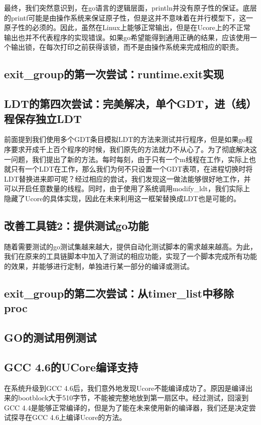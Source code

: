 \documentclass{article}
\begin{document}
最终，我们突然意识到，在go语言的逻辑层面，println并没有原子性的保证。底层的printf可能是由操作系统来保证原子性，但是这并不意味着在并行模型下，这一原子性的必须的。因此，虽然在Linux上能够正常输出，但是在Ucore上的不正常输出也并不代表程序的实现错误。如果go希望能得到通用正确的结果，应该使用一个输出锁，在每次打印之前获得该锁，而不是由操作系统来完成相应的职责。

\subsection{exit\_group的第一次尝试：runtime.exit实现}

\subsection{LDT的第四次尝试：完美解决，单个GDT，进（线）程保存独立LDT}
前面提到我们使用多个GDT条目模拟LDT的方法来测试并行程序，但是如果go程序要求开成千上百个程序的时候，我们原先的方法就力不从心了。为了彻底解决这一问题，我们提出了新的方法。每时每刻，由于只有一个m线程在工作，实际上也就只有一个LDT在工作，那么我们为何不只设置一个GDT表项，在进程切换时将LDT替换进来即可呢？经过相应的尝试，我们发现这一做法能够很好地工作，并可以开启任意数量的线程。同时，由于使用了系统调用modify\_ldt，我们实际上隐藏了Ucore的具体实现，因此在未来利用这一框架替换成LDT也是可能的。

\subsection{改善工具链2：提供测试go功能}
随着需要测试的go测试集越来越大，提供自动化测试脚本的需求越来越高。为此，我们在原来的工具链脚本中加入了测试的相应功能，实现了一个脚本完成所有功能的效果，并能够进行定制，单独进行某一部分的编译或测试。

\subsection{exit\_group的第二次尝试：从timer\_list中移除proc}

\subsection{GO的测试用例测试}

\subsection{GCC 4.6的UCore编译支持}
在系统升级到GCC 4.6后，我们意外地发现Ucore不能编译成功了。原因是编译出来的bootblock大于510字节，不能被完整地放到第一扇区中。经过测试，回滚到GCC 4.4是能够正常编译的，但是为了能在未来使用新的编译器，我们还是决定尝试探寻在GCC 4.6上编译Ucore的方法。
\end{document}
